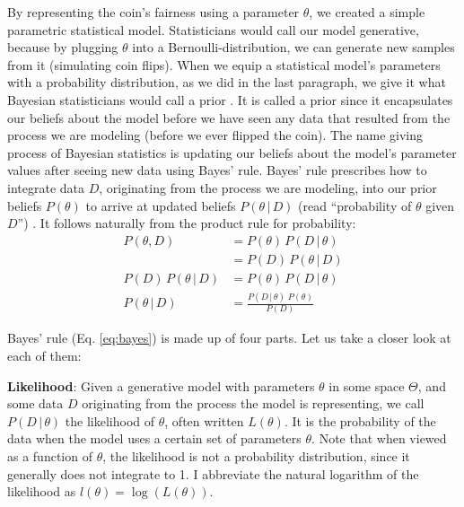 \documentclass[12pt, a4paper]{report}
\begin{document}
By representing the coin's fairness using a parameter $\theta$, we created a simple parametric statistical model.
Statisticians would call our model generative, because by plugging $\theta$ into a Bernoulli-distribution, we can generate new samples from it (simulating coin flips).
When we equip a statistical model's parameters with a probability distribution, as we did in the last paragraph, we give it what Bayesian statisticians would call a prior \cite[34]{mcelreath}.
It is called a prior since it encapsulates our beliefs about the model before we have seen any data that resulted from the process we are modeling (before we ever flipped the coin).
The name giving process of Bayesian statistics is updating our beliefs about the model's parameter values after seeing new data using Bayes' rule.
Bayes' rule prescribes how to integrate data $D$, originating from the process we are modeling, into our prior beliefs $P(\theta)$ to arrive at updated beliefs $P(\theta \, | \, D)$ (read ``probability of $\theta$ given $D$'') \cite[36]{mcelreath}.
It follows naturally from the product rule for probability:
\begin{align}
    P(\theta, D) &= P(\theta) \, P(D \,|\, \theta) \nonumber\\
    &= P(D) \, P(\theta \,|\, D) \nonumber\\
    P(D) \, P(\theta \,|\, D) &= P(\theta) \, P(D \,|\, \theta) \nonumber\\
    P(\theta \, | \, D) &= \frac{P(D \,|\, \theta) \; P(\theta)}{P(D)}
    \label{eq:bayes}
\end{align}

Bayes' rule (Eq. \ref{eq:bayes}) is made up of four parts.
Let us take a closer look at each of them:

\textbf{Likelihood}: Given a generative model with parameters $\theta$ in some space $\Theta$, and some data $D$ originating from the process the model is representing, we call $P(D \,|\, \theta)$ the likelihood of $\theta$, often written $L(\theta)$.
It is the probability of the data when the model uses a certain set of parameters $\theta$.
Note that when viewed as a function of $\theta$, the likelihood is not a probability distribution, since it generally does not integrate to 1.
I abbreviate the natural logarithm of the likelihood as $l(\theta) = \log(L(\theta))$.
\end{document}
